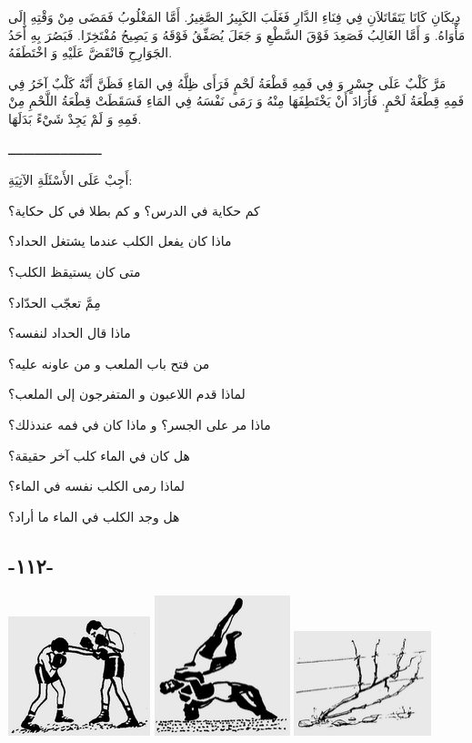 \documentclass[a5paper]{article}
\begin{document}
دِيكَانِ كَانَا يَتَقَاتَلاَنِ فِي فِنَاءِ الدَّارِ فَغَلَبَ الكَبِيرُ الصَّغِيرُ. أَمَّا المَغْلُوبُ فَمَضَى مِنْ وَقْتِهِ إِلَى مَأْوَاهُ. وَ أَمَّا الغَالِبُ فَصَعِدَ فَوْقَ السَّطْعِ وَ جَعَلَ يُصَفِّقُ فَوْقَهُ وَ يَصِيحُ مُفْتَخِرًا. فَبَصُرَ بِهِ أَحَدُ الجَوَارِحِ فَانْقَضَّ عَلَيْهِ وَ اخْتَطَفَهُ. 

مَرَّ كَلْبٌ عَلَى جِسْرٍ وَ فِي فَمِهِ قَطْعَةُ لَحْمٍ فَرَأَى ظِلَّهُ فِي المَاءِ فَظَنَّ أَنَّهُ كَلْبٌ آخَرُ فِي فَمِهِ قِطْعَةُ لَحْمٍ. فَأَرَادَ أَنْ يَخْتَطِفَهَا مِنْهُ وَ رَمَى نَفْسَهُ فِي المَاءِ فَسَقَطَتْ قِطْعَةُ اللَّحْمِ مِنْ فَمِهِ وَ لَمْ يَجِدْ شَيْءً بَدَلَهَا.

ـــــــــــــــــــــــــ

أَجِبْ عَلَى الأَسْئَلَةِ الآتِيَةِ:

كم حكاية في الدرس؟ و كم بطلا في كل حكاية؟ 

ماذا كان يفعل الكلب عندما يشتغل الحداد؟

متى كان يستيقظ الكلب؟

مِمَّ تعجّب الحدّاد؟

ماذا قال الحداد لنفسه؟

من فتح باب الملعب و من عاونه عليه؟

لماذا قدم اللاعبون و المتفرجون إلى الملعب؟

ماذا مر على الجسر؟ و ماذا كان في فمه عندذلك؟ 

هل كان في الماء كلب آخر حقيقة؟

لماذا رمى الكلب نفسه في الماء؟

هل وجد الكلب في الماء ما أراد؟

\subsection{-١١٢-}
 \includegraphics[width=1.6252in,height=1.3646in]{images/MuhammadBagauddinprettified-img289.png}   \includegraphics[width=1.552in,height=1.6146in]{images/MuhammadBagauddinprettified-img290.png}   \includegraphics[width=1.5728in,height=1.2083in]{images/MuhammadBagauddinprettified-img291.png} 
\end{document}
